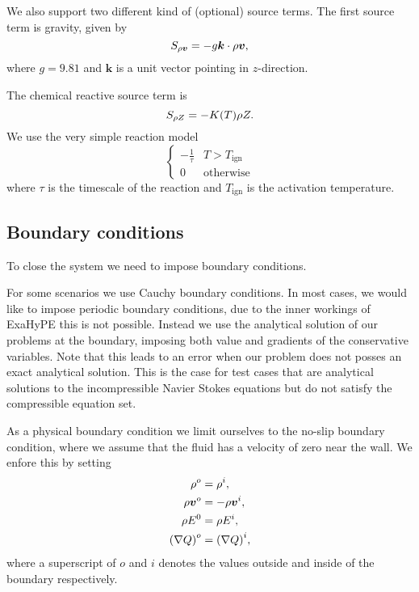 We also support two different kind of (optional) source terms.
The first source term is gravity, given by
\begin{equation}\label{eq:source-gravity}
  \source[\Qj] = - g \bm{k} \cdot \Qj,
\end{equation}
where $g = 9.81$ and $\bm{k}$ is a unit vector pointing in $z$-direction.

\newcommand{\reactionTimescale}{\tau}
\newcommand{\reactionTemperature}{T_{\text{ign}}}
The chemical reactive source term is
\begin{equation}\label{eq:source-reaction}
  \source[\QZ] = - K(T) \QZ.
\end{equation}
We use the very simple reaction model
\begin{equation}\label{eq:reaction-model}
\begin{cases}
  - \frac{1}{\reactionTimescale} & T > \reactionTemperature\\
  0 & \text{otherwise}
\end{cases}  
\end{equation}
where $\reactionTimescale$ is the timescale of the reaction and $\reactionTemperature$ is the activation temperature.

\subsection{Boundary conditions}
To close the system we need to impose boundary conditions.

For some scenarios we use Cauchy boundary conditions.
In most cases, we would like to impose periodic boundary conditions, due to the inner workings of ExaHyPE this is not possible.
Instead we use the analytical solution of our problems at the boundary, imposing both value and gradients of the conservative variables.
Note that this leads to an error when our problem does not posses an exact analytical solution.
This is the case for test cases that are analytical solutions to the incompressible Navier Stokes equations but do not satisfy the compressible equation set.

As a physical boundary condition we limit ourselves to the no-slip boundary condition, where we assume that the fluid has a velocity of zero near the wall.
We enfore this by setting
\begin{align}
  \label{eq:no-slip}
  \begin{split}
  \rho^o &= \rho^i, \\
  \rho \bm{v}^o &= -\rho \bm{v}^i, \\
  \rho E^0 &= \rho E^i,\\
  {(\nabla Q)}^o &= {(\nabla Q)}^i,
  \end{split}
\end{align}
where a superscript of $o$ and $i$ denotes the values outside and inside of the boundary respectively.

